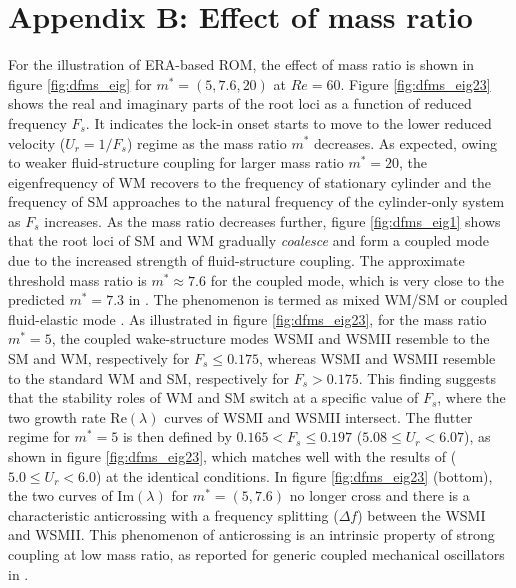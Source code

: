 \documentclass{jfm}
\begin{document}
\section*{Appendix B: Effect of mass ratio}
\setcounter{figure}{0}
For the illustration of ERA-based ROM, the effect of mass ratio is shown in
figure \ref{fig:dfms_eig} for $m^*=(5,7.6,20)$ at $Re=60$. 
Figure \ref{fig:dfms_eig23} shows the real and imaginary parts of the root loci as 
a function of reduced frequency $F_s$. 
It indicates the lock-in onset starts to move 
to the lower reduced velocity ($U_r=1/F_s$) regime as 
the mass ratio $m^*$ decreases. 
As expected, owing to weaker fluid-structure coupling for 
larger mass ratio $m^*=20$, the eigenfrequency of WM recovers to 
the frequency of stationary cylinder and the frequency of SM approaches to 
the natural frequency of the cylinder-only system as $F_s$ increases. 
As the mass ratio decreases further, 
figure \ref{fig:dfms_eig1} shows that the root loci of SM and WM
gradually \emph{coalesce} and form a coupled mode due to the 
increased strength of fluid-structure coupling.
The approximate threshold mass ratio is $m^{*} \approx 7.6$ for 
the coupled mode, which is very 
close to the predicted $m^{*}=7.3$ in \cite{Zhang2015}.  %
The phenomenon is termed as mixed WM/SM \citep{meliga2011} 
or coupled fluid-elastic mode \citep{mittal2016}. 
As illustrated in figure \ref{fig:dfms_eig23}, for the mass ratio $m^*=5$, 
the coupled wake-structure modes WSMI and WSMII 
resemble to the SM and WM, respectively for $F_s \le 0.175$, 
whereas WSMI and WSMII resemble to the standard
WM and SM, respectively for $F_s > 0.175$. 
%
This finding suggests that 
the stability roles of WM and SM switch at a specific value of $F_s$, 
where the two growth rate Re$(\lambda)$ curves of WSMI and WSMII intersect. 
%
The flutter regime for $m^*=5$ is then defined by 
$0.165 < F_s \le 0.197$ ($5.08 \le U_r < 6.07$),
as shown in figure \ref{fig:dfms_eig23}, which
matches well with the results of \cite{mittal2016} ($5.0 \le U_r < 6.0$) 
at the identical conditions.  
%
In figure \ref{fig:dfms_eig23} (bottom),
the two curves of Im$(\lambda)$ for $m^*=(5,7.6)$ no longer cross and there is 
a characteristic anticrossing with a frequency splitting ($\Delta f$) between the WSMI and WSMII.
This phenomenon of anticrossing is an intrinsic property of strong coupling 
at low mass ratio, as reported for generic coupled mechanical 
oscillators in \cite{novotny2010}. 
\end{document}
